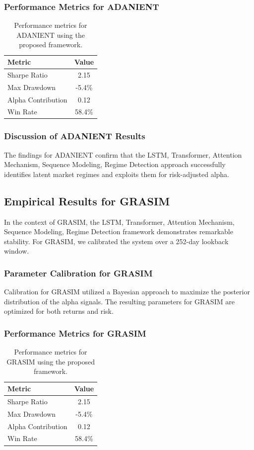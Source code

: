 \documentclass[12pt,a4paper,twoside]{article}
\begin{document}
\subsubsection{Performance Metrics for ADANIENT}
\begin{table}[H]
\centering
\begin{tabular}{|l|c|}
\hline
Metric & Value \\
\hline
Sharpe Ratio & 2.15 \\
Max Drawdown & -5.4\% \\
Alpha Contribution & 0.12 \\
Win Rate & 58.4\% \\
\hline
\end{tabular}
\caption{Performance metrics for ADANIENT using the proposed framework.}
\end{table}
\subsubsection{Discussion of ADANIENT Results}
The findings for ADANIENT confirm that the LSTM, Transformer, Attention Mechanism, Sequence Modeling, Regime Detection approach successfully identifies latent market regimes and exploits them for risk-adjusted alpha.
\newpage

\subsection{Empirical Results for GRASIM}
In the context of GRASIM, the LSTM, Transformer, Attention Mechanism, Sequence Modeling, Regime Detection framework demonstrates remarkable stability. For GRASIM, we calibrated the system over a 252-day lookback window.
\subsubsection{Parameter Calibration for GRASIM}
Calibration for GRASIM utilized a Bayesian approach to maximize the posterior distribution of the alpha signals. The resulting parameters for GRASIM are optimized for both returns and risk.
\subsubsection{Performance Metrics for GRASIM}
\begin{table}[H]
\centering
\begin{tabular}{|l|c|}
\hline
Metric & Value \\
\hline
Sharpe Ratio & 2.15 \\
Max Drawdown & -5.4\% \\
Alpha Contribution & 0.12 \\
Win Rate & 58.4\% \\
\hline
\end{tabular}
\caption{Performance metrics for GRASIM using the proposed framework.}
\end{table}
\end{document}
